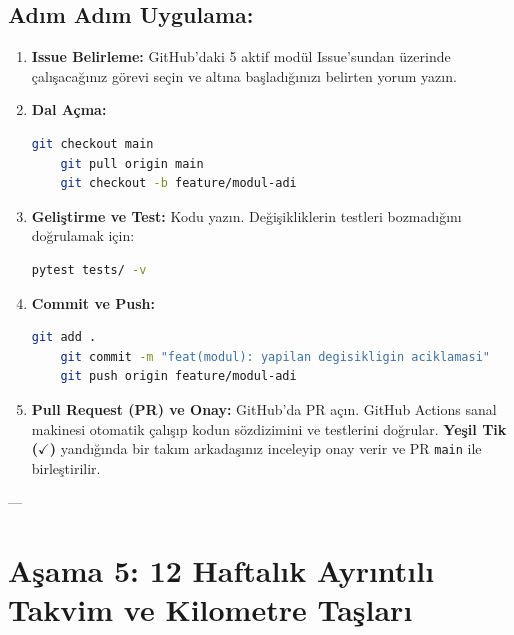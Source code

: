 \documentclass[11pt, a4paper]{article}
\begin{document}
\subsection{Adım Adım Uygulama:}
\begin{enumerate}[leftmargin=1.8em, itemsep=0.4em]
    \item \textbf{Issue Belirleme:} GitHub'daki 5 aktif modül Issue'sundan üzerinde çalışacağınız görevi seçin ve altına başladığınızı belirten yorum yazın.
    \item \textbf{Dal Açma:}
    \begin{lstlisting}[language=bash]
    git checkout main
    git pull origin main
    git checkout -b feature/modul-adi
    \end{lstlisting}
    \item \textbf{Geliştirme ve Test:} Kodu yazın. Değişikliklerin testleri bozmadığını doğrulamak için:
    \begin{lstlisting}[language=bash]
    pytest tests/ -v
    \end{lstlisting}
    \item \textbf{Commit ve Push:}
    \begin{lstlisting}[language=bash]
    git add .
    git commit -m "feat(modul): yapilan degisikligin aciklamasi"
    git push origin feature/modul-adi
    \end{lstlisting}
    \item \textbf{Pull Request (PR) ve Onay:} GitHub'da PR açın. GitHub Actions sanal makinesi otomatik çalışıp kodun sözdizimini ve testlerini doğrular. \textbf{Yeşil Tik ($\checkmark$)} yandığında bir takım arkadaşınız inceleyip onay verir ve PR \texttt{main} ile birleştirilir.
\end{enumerate}

---

\section{Aşama 5: 12 Haftalık Ayrıntılı Takvim ve Kilometre Taşları}
\end{document}
